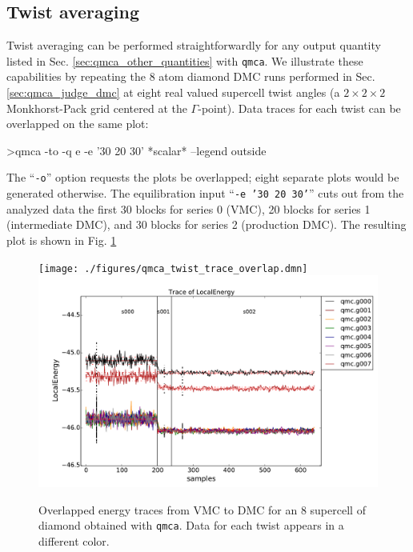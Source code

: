 \subsection{Twist averaging}
\label{sec:qmca_twist_average}
Twist averaging can be performed straightforwardly for any 
output quantity listed in Sec. \ref{sec:qmca_other_quantities} 
with \texttt{qmca}.  We illustrate these capabilities by 
repeating the 8 atom diamond DMC runs performed in Sec. 
\ref{sec:qmca_judge_dmc} at eight real valued supercell twist 
angles (a $2\times 2\times 2$ Monkhorst-Pack grid centered at 
the $\Gamma$-point).  Data traces for each twist can be overlapped 
on the same plot:
\begin{shade}
>qmca -to -q e -e '30 20 30' *scalar* --legend outside
\end{shade}
\noindent
The ``\texttt{-o}'' option requests the plots be overlapped; 
eight separate plots would be generated otherwise.  The 
equilibration input ``\texttt{-e '30 20 30'}'' cuts out from 
the analyzed data the first 30 blocks for series 0 (VMC), 
20 blocks for series 1 (intermediate DMC), and 30 blocks for 
series 2 (production DMC).  The resulting plot is shown in 
Fig. \ref{fig:qmca_twist_overlap}

\begin{figure}
\begin{center}
\ifdefined\HCode
\texttt{[image: ./figures/qmca\_twist\_trace\_overlap.dmn]}
\else
\includegraphics[trim = 0mm 0mm 0mm 0mm, clip,width=0.9\columnwidth]{./figures/qmca_twist_trace_overlap.pdf}
\fi
\end{center}
\caption{Overlapped energy traces from VMC to DMC for an 8 supercell of diamond obtained with \texttt{qmca}.  Data for each twist appears in a different color.}
\label{fig:qmca_twist_overlap}
\end{figure}

